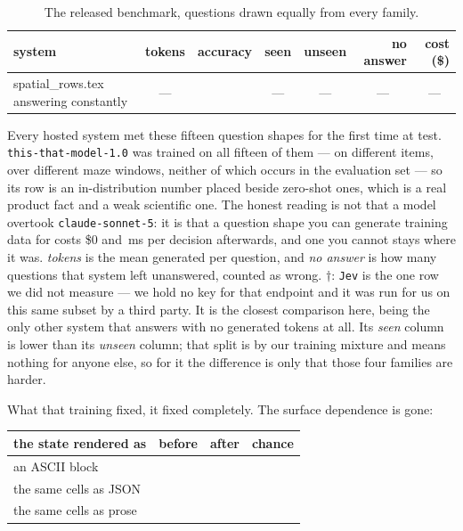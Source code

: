 \documentclass[11pt]{article}
\makeatletter
\newcommand{\rowsfrom}[1]{\@@input #1 }
\newenvironment{tabnotes}[1][\textwidth]
  {\par\addvspace{5pt}\begin{minipage}{#1}\footnotesize\setlength{\parindent}{0pt}\raggedright}
  {\end{minipage}\par}
\newcommand{\nodataplain}{\textcolor{rulegrey!45!black}{---}}
\newcommand{\nodata}{\multicolumn{1}{c}{\nodataplain}}
\newcommand{\Ours}{\texttt{this-that-model-1.0}}
\newcommand{\1}{\mathbf{1}}
\makeatother
\begin{document}
\begin{table}[t]
\centering\small
\caption{The released benchmark, \spatialN{} questions drawn equally from every family.}
\label{tab:spatial}
\begin{tabular}{l rrrr rr}
\toprule
system & tokens & accuracy & seen & unseen & no answer & cost (\$) \\
\midrule
\rowsfrom{spatial_rows.tex}
\midrule
answering constantly & \nodata & \spatialChance{} & \nodata & \nodata & \nodata & \nodata \\
\bottomrule
\end{tabular}
\begin{tabnotes}
Every
hosted system met these fifteen question shapes for the first time at test. \Ours{} was trained on
all fifteen of them --- on different items, over different maze windows, neither of which occurs in
the evaluation set --- so its row is an in-distribution number placed beside zero-shot ones, which
is a real product fact and a weak scientific one. The honest reading is not that a
\paramCountShort{} model overtook \texttt{claude-sonnet-5}: it is that a question shape you can
generate training data for costs \$0 and \oursMsPerDecision{}\,ms per decision afterwards, and one
you cannot stays where it was. \emph{tokens} is the mean generated per question, and
\emph{no answer} is how many questions that system left unanswered, counted as wrong.
$\dagger$: \texttt{Jev} is the one row we did not measure --- we hold no key for
that endpoint and it was run for us on this same subset by a third party. It is the closest
comparison here, being the only other system that answers with no generated tokens at all. Its
\emph{seen} column is lower than its \emph{unseen} column; that split is by our training mixture
and means nothing for anyone else, so for it the difference is only that those four families are
harder.
\end{tabnotes}
\end{table}

What that training fixed, it fixed completely. The surface dependence is gone:

\par\addvspace{0.9em}
{\centering\small
\begin{tabular}{l rrr}
\toprule
the state rendered as & before & after & chance \\
\midrule
an ASCII block         & \surfAsciiBefore{} & \surfAscii{} & \surfAsciiChance{} \\
the same cells as JSON & \surfJsonBefore{}  & \surfJson{}  & \surfJsonChance{} \\
the same cells as prose & \surfRowsBefore{} & \surfRows{}  & \surfRowsChance{} \\
\bottomrule
\end{tabular}\par}
\addvspace{0.9em}
\end{document}
